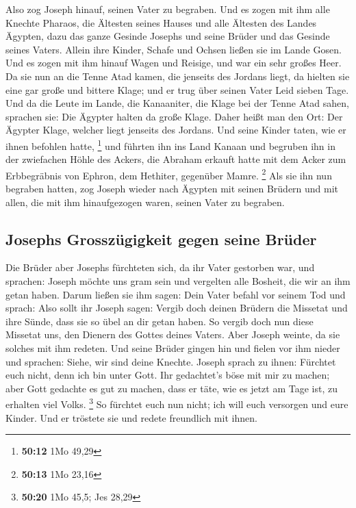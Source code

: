  Also zog Joseph hinauf, seinen Vater zu begraben. Und es
zogen mit ihm alle Knechte Pharaos, die Ältesten seines Hauses und alle
Ältesten des Landes Ägypten,  dazu das ganze Gesinde
Josephs und seine Brüder und das Gesinde seines Vaters. Allein ihre
Kinder, Schafe und Ochsen ließen sie im Lande Gosen.  Und
es zogen mit ihm hinauf Wagen und Reisige, und war ein sehr großes Heer.
 Da sie nun an die Tenne Atad kamen, die jenseits des
Jordans liegt, da hielten sie eine gar große und bittere Klage; und er
trug über seinen Vater Leid sieben Tage.  Und da die
Leute im Lande, die Kanaaniter, die Klage bei der Tenne Atad sahen,
sprachen sie: Die Ägypter halten da große Klage. Daher heißt man den
Ort: Der Ägypter Klage, welcher liegt jenseits des Jordans.
 Und seine Kinder taten, wie er ihnen befohlen hatte,
\footnote{\textbf{50:12} 1Mo 49,29}  und führten ihn ins
Land Kanaan und begruben ihn in der zwiefachen Höhle des Ackers, die
Abraham erkauft hatte mit dem Acker zum Erbbegräbnis von Ephron, dem
Hethiter, gegenüber Mamre. \footnote{\textbf{50:13} 1Mo 23,16}
 Als sie ihn nun begraben hatten, zog Joseph wieder nach
Ägypten mit seinen Brüdern und mit allen, die mit ihm hinaufgezogen
waren, seinen Vater zu begraben.

\hypertarget{josephs-grosszuxfcgigkeit-gegen-seine-bruxfcder}{%
\subsection{Josephs Grosszügigkeit gegen seine
Brüder}\label{josephs-grosszuxfcgigkeit-gegen-seine-bruxfcder}}

 Die Brüder aber Josephs fürchteten sich, da ihr Vater
gestorben war, und sprachen: Joseph möchte uns gram sein und vergelten
alle Bosheit, die wir an ihm getan haben.  Darum ließen
sie ihm sagen: Dein Vater befahl vor seinem Tod und sprach:
 Also sollt ihr Joseph sagen: Vergib doch deinen Brüdern
die Missetat und ihre Sünde, dass sie so übel an dir getan haben. So
vergib doch nun diese Missetat uns, den Dienern des Gottes deines
Vaters. Aber Joseph weinte, da sie solches mit ihm redeten.
 Und seine Brüder gingen hin und fielen vor ihm nieder
und sprachen: Siehe, wir sind deine Knechte.  Joseph
sprach zu ihnen: Fürchtet euch nicht, denn ich bin unter Gott.
 Ihr gedachtet's böse mit mir zu machen; aber Gott
gedachte es gut zu machen, dass er täte, wie es jetzt am Tage ist, zu
erhalten viel Volks. \footnote{\textbf{50:20} 1Mo 45,5; Jes 28,29}
 So fürchtet euch nun nicht; ich will euch versorgen und
eure Kinder. Und er tröstete sie und redete freundlich mit ihnen.

